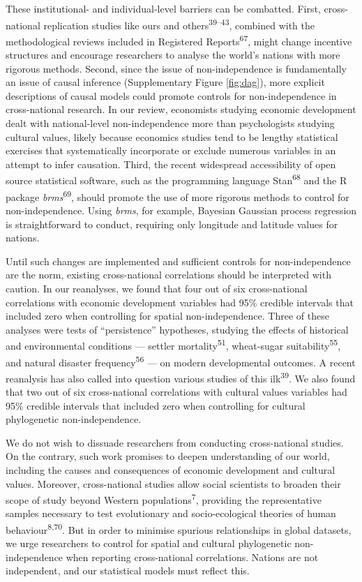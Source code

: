 \documentclass[english,man,floatsintext]{apa6}
\begin{document}
These institutional- and individual-level barriers can be combatted. First, cross-national replication studies like ours and others\textsuperscript{39--43}, combined with the methodological reviews included in Registered Reports\textsuperscript{67}, might change incentive structures and encourage researchers to analyse the world's nations with more rigorous methods. Second, since the issue of non-independence is fundamentally an issue of causal inference (Supplementary Figure \ref{fig:dag}), more explicit descriptions of causal models could promote controls for non-independence in cross-national research. In our review, economists studying economic development dealt with national-level non-independence more than psychologists studying cultural values, likely because economics studies tend to be lengthy statistical exercises that systematically incorporate or exclude numerous variables in an attempt to infer causation. Third, the recent widespread accessibility of open source statistical software, such as the programming language Stan\textsuperscript{68} and the R package \emph{brms}\textsuperscript{69}, should promote the use of more rigorous methods to control for non-independence. Using \emph{brms}, for example, Bayesian Gaussian process regression is straightforward to conduct, requiring only longitude and latitude values for nations.

Until such changes are implemented and sufficient controls for non-independence are the norm, existing cross-national correlations should be interpreted with caution. In our reanalyses, we found that four out of six cross-national correlations with economic development variables had 95\% credible intervals that included zero when controlling for spatial non-independence. Three of these analyses were tests of \enquote{persistence} hypotheses, studying the effects of historical and environmental conditions --- settler mortality\textsuperscript{51}, wheat-sugar suitability\textsuperscript{55}, and natural disaster frequency\textsuperscript{56} --- on modern developmental outcomes. A recent reanalysis has also called into question various studies of this ilk\textsuperscript{39}. We also found that two out of six cross-national correlations with cultural values variables had 95\% credible intervals that included zero when controlling for cultural phylogenetic non-independence.

We do not wish to dissuade researchers from conducting cross-national studies. On the contrary, such work promises to deepen understanding of our world, including the causes and consequences of economic development and cultural values. Moreover, cross-national studies allow social scientists to broaden their scope of study beyond Western populations\textsuperscript{7}, providing the representative samples necessary to test evolutionary and socio-ecological theories of human behaviour\textsuperscript{8,70}. But in order to minimise spurious relationships in global datasets, we urge researchers to control for spatial and cultural phylogenetic non-independence when reporting cross-national correlations. Nations are not independent, and our statistical models must reflect this.
\end{document}
